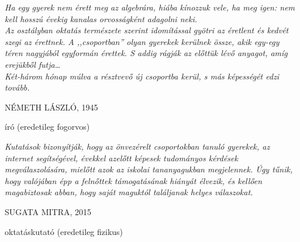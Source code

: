 \newlength\longest
\cleardoublepage
\thispagestyle{empty}
\null\vfill
{\centering
\parbox{0.8\textwidth} {%
    \raggedright{\large\itshape%
    Ha egy gyerek nem érett meg az algebrára, hiába kínozzuk vele,  
    ha meg igen: nem kell hosszú évekig kanalas orvosságként adagolni neki. \\
    Az osztályban oktatás természete szerint idomítással gyötri az éretlent 
    és kedvét szegi az érettnek. A ,,csoportban'' olyan gyerekek kerülnek össze, akik egy-egy téren 
    nagyjából egyformán érettek. S addig rágják az előttük lévő anyagot, amíg erejükből futja\ldots\\ 
    Két-három hónap múlva a résztvevő új csoportba kerül, s más képességét edzi tovább.

        \par\bigskip
    }
    \raggedleft\Large\MakeUppercase{Németh László, 1945}\par%
    \raggedleft\normalsize{író (eredetileg fogorvos)}\par%
}\par%
}
\vfill\vfill
\bigskip
\null\vfill
{\centering
\parbox{0.8\textwidth} {%
    \raggedright{\large\itshape%
    Kutatások bizonyítják, hogy az önvezérelt csoportokban tanuló gyerekek, az internet segítségével, évekkel azelőtt képesek tudományos kérdések megválaszolására, mielőtt azok az iskolai tananyagukban megjelennek. Úgy tűnik, hogy valójában épp a felnőttek támogatásának hiányát élvezik, és kellően magabiztosak abban, hogy saját maguktól találjanak helyes válaszokat.

        \par\bigskip
    }
    \raggedleft\Large\MakeUppercase{Sugata Mitra, 2015}\par%
    \raggedleft\normalsize{oktatáskutató (eredetileg fizikus)}\par%
}\par%
}

\vfill\vfill
\clearpage


